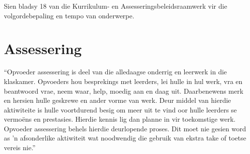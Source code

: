Sien bladsy 18 van die Kurrikulum- en Assesseringsbeleidsraamwerk vir
die volgordebepaling en tempo van onderwerpe.

\section{Assessering}
``Opvoeder assessering is deel van die alledaagse onderrig en leerwerk
in die klaskamer. Opvoeders hou besprekings met leerders, lei hulle in
hul werk, vra en beantwoord vrae, neem waar, help, moedig aan en daag
uit. Daarbenewens merk en hersien hulle geskrewe en ander vorme van
werk. Deur middel van hierdie aktiwiteite is hulle voortdurend besig
om meer uit te vind oor hulle leerders se vermo\"{e}ns en
prestasies. Hierdie kennis lig dan planne in vir toekomstige
werk. Opvoeder assessering behels hierdie deurlopende proses. Dit moet
nie gesien word as 'n afsonderlike aktiwiteit wat noodwendig die
gebruik van ekstra take of toetse vereis nie.''\par

